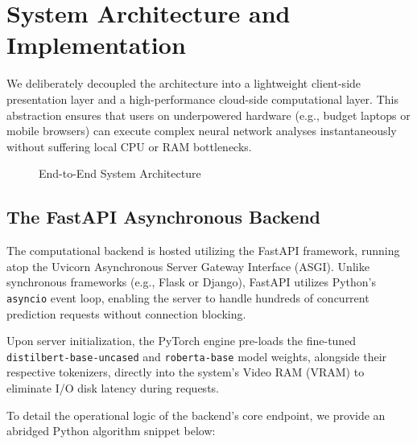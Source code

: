 \documentclass[conference]{IEEEtran}
\begin{document}
\section{System Architecture and Implementation}

We deliberately decoupled the architecture into a lightweight client-side presentation layer and a high-performance cloud-side computational layer. This abstraction ensures that users on underpowered hardware (e.g., budget laptops or mobile browsers) can execute complex neural network analyses instantaneously without suffering local CPU or RAM bottlenecks.

\begin{figure}[h]
\centering
{}
\caption{End-to-End System Architecture}
\label{fig:arch}
\end{figure}

\subsection{The FastAPI Asynchronous Backend}
The computational backend is hosted utilizing the FastAPI framework, running atop the Uvicorn Asynchronous Server Gateway Interface (ASGI). Unlike synchronous frameworks (e.g., Flask or Django), FastAPI utilizes Python's \texttt{asyncio} event loop, enabling the server to handle hundreds of concurrent prediction requests without connection blocking.

Upon server initialization, the PyTorch engine pre-loads the fine-tuned \texttt{distilbert-base-uncased} and \texttt{roberta-base} model weights, alongside their respective tokenizers, directly into the system's Video RAM (VRAM) to eliminate I/O disk latency during requests.

To detail the operational logic of the backend's core endpoint, we provide an abridged Python algorithm snippet below:
\end{document}
